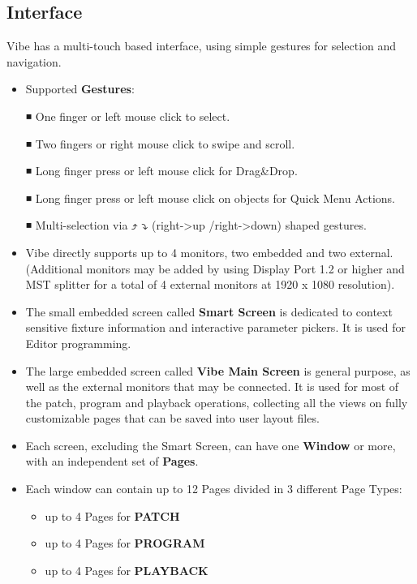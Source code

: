 \documentclass[
]{article}
\begin{document}
\hypertarget{Interface-3.1}{%
\subsection{Interface}\label{Interface-3.1}}

Vibe has a multi-touch based interface, using simple gestures for selection and navigation.

\begin{itemize}
\item
  Supported \textbf{Gestures}:

  ◾ One finger or left mouse click to select.

  ◾ Two fingers or right mouse click to swipe and scroll.

  ◾ Long finger press or left mouse click for Drag\&Drop.

  ◾ Long finger press or left mouse click on objects for Quick Menu Actions.

  ◾ Multi-selection via ️️⤴ ⤵ (right-\textgreater up /right-\textgreater down) shaped gestures.
\item
  Vibe directly supports up to 4 monitors, two embedded and two external. (Additional monitors may be added by using Display Port 1.2 or higher and MST splitter for a total of 4 external monitors at 1920 x 1080 resolution).
\item
  The small embedded screen called \textbf{Smart Screen} is dedicated to context sensitive fixture information and interactive parameter pickers. It is used for Editor programming.
\item
  The large embedded screen called \textbf{Vibe Main Screen} is general purpose, as well as the external monitors that may be connected. It is used for most of the patch, program and playback operations, collecting all the views on fully customizable pages that can be saved into user layout files.
\item
  Each screen, excluding the Smart Screen, can have one \textbf{Window} or more, with an independent set of \textbf{Pages}.
\item
  Each window can contain up to 12 Pages divided in 3 different Page Types:

  \begin{itemize}
  \item
    up to 4 Pages for \textbf{PATCH}
  \item
    up to 4 Pages for \textbf{PROGRAM}
  \item
    up to 4 Pages for \textbf{PLAYBACK}
  \end{itemize}
\end{itemize}
\end{document}
